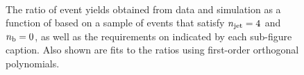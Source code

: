 \begin{figure}[h!]
\begin{center}
    \\
    \caption{The ratio of event yields obtained from data and simulation as a function of \mht [GeV] based on a sample of \mj events that satisfy $n_{\text{jet}} = 4$ and $n_{\text{b}} = 0$, as well as the requirements on \scalht indicated by each sub-figure caption. Also shown are fits to the ratios using first-order orthogonal polynomials.}
    \label{fig:mhtval_Mu_eq4j_eq0b}
  \end{center}
\end{figure}

